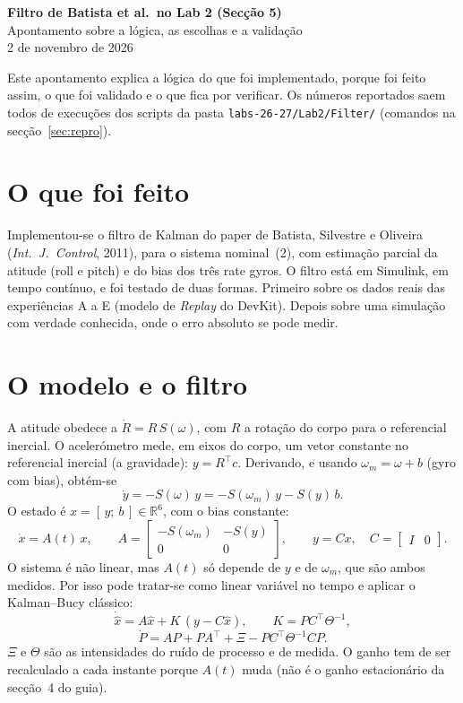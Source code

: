 \documentclass[10pt,a4paper]{article}
\newcommand{\code}[1]{\texttt{#1}}
\newcommand{\Sk}{S}          %
\newcommand{\wm}{\omega_m}
\begin{document}
\begin{center}
{\Large\bfseries Filtro de Batista et al.\ no Lab 2 (Sec\c{c}\~ao 5)}\\[0.6ex]
{\large Apontamento sobre a l\'ogica, as escolhas e a valida\c{c}\~ao}\\[0.6ex]
{\small 2 de novembro de 2026}
\end{center}

Este apontamento explica a l\'ogica do que foi implementado, porque foi feito assim, o que foi validado e o que fica por verificar.
Os n\'umeros reportados saem todos de execu\c{c}\~oes dos scripts da pasta \code{labs-26-27/Lab2/Filter/} (comandos na sec\c{c}\~ao~\ref{sec:repro}).

\section{O que foi feito}

Implementou-se o filtro de Kalman do paper de Batista, Silvestre e Oliveira (\emph{Int.\ J.\ Control}, 2011), para o sistema nominal~(2), com estima\c{c}\~ao parcial da atitude (roll e pitch) e do bias dos tr\^es rate gyros.
O filtro est\'a em Simulink, em tempo cont\'inuo, e foi testado de duas formas.
Primeiro sobre os dados reais das experi\^encias A a E (modelo de \emph{Replay} do DevKit).
Depois sobre uma simula\c{c}\~ao com verdade conhecida, onde o erro absoluto se pode medir.

\section{O modelo e o filtro}

A atitude obedece a $\dot R = R\,\Sk(\omega)$, com $R$ a rota\c{c}\~ao do corpo para o referencial inercial.
O aceler\'ometro mede, em eixos do corpo, um vetor constante no referencial inercial (a gravidade): $y = R^\top c$.
Derivando, e usando $\wm = \omega + b$ (gyro com bias), obt\'em-se
\[
\dot y = -\Sk(\omega)\,y = -\Sk(\wm)\,y - \Sk(y)\,b .
\]
O estado \'e $x = [\,y;\ b\,] \in \mathbb{R}^6$, com o bias constante:
\[
\dot x = A(t)\,x,\qquad
A = \begin{bmatrix} -\Sk(\wm) & -\Sk(y) \\ 0 & 0 \end{bmatrix},\qquad
y = C x,\quad C = \begin{bmatrix} I & 0 \end{bmatrix}.
\]
O sistema \'e n\~ao linear, mas $A(t)$ s\'o depende de $y$ e de $\wm$, que s\~ao ambos medidos.
Por isso pode tratar-se como linear vari\'avel no tempo e aplicar o Kalman--Bucy cl\'assico:
\[
\dot{\hat x} = A\hat x + K\,(y - C\hat x),\qquad K = P C^\top \Theta^{-1},
\]
\[
\dot P = A P + P A^\top + \Xi - P C^\top \Theta^{-1} C P .
\]
$\Xi$ e $\Theta$ s\~ao as intensidades do ru\'ido de processo e de medida.
O ganho tem de ser recalculado a cada instante porque $A(t)$ muda (n\~ao \'e o ganho estacion\'ario da sec\c{c}\~ao~4 do guia).
\end{document}
